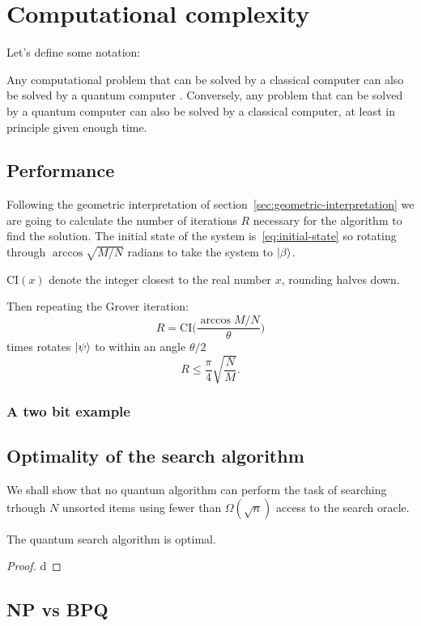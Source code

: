 \section{Computational complexity}
Let's define some notation:

Any computational problem that can be solved by a classical computer can also be solved by a quantum computer \cite[29]{NielsenChuang}. Conversely, any problem that can be solved by a quantum computer can also be solved by a classical computer, at least in principle given enough time.
\subsection{Performance}\label{sec:performance}
Following the geometric interpretation of section~\ref{sec:geometric-interpretation} we are going to calculate the number of iterations $R$ necessary for the algorithm to find the solution. The initial state of the system is~\ref{eq:initial-state} so rotating through $\arccos{\sqrt{M/N}}$ radians to take the system to $\ket{\beta}$.
\begin{defn}
$\text{CI}(x)$ denote the integer closest to the real number $x$, rounding halves down.
\end{defn}
Then repeating the Grover iteration:
\begin{equation*}
    R = \text{CI}\biggl(\frac{\arccos{M/N}}{\theta}\biggr)
\end{equation*}
times rotates $\ket{\psi}$ to within an angle $\theta/2$
\begin{equation*}
    R \leq \frac{\pi}{4} \sqrt{\frac{N}{M}}.
\end{equation*}
\subsubsection{A two bit example}

\subsection{Optimality of the search algorithm}
We shall show that no quantum algorithm can perform the task of searching trhough $N$ unsorted items using fewer than $\Omega(\sqrt{n})$ access to the search oracle.
\begin{theorem}
The quantum search algorithm is optimal. 
\end{theorem}
\begin{proof}
d
\end{proof}
\subsection{NP vs BPQ}